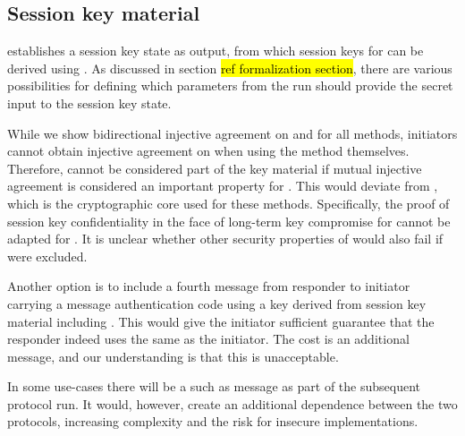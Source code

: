 \documentclass[runningheads,draft,x11names]{llncs}
\begin{document}

%

\subsection{Session key material}
\label{sec:sessionKeyMaterial}
\mEdhoc{} establishes a session key state as output, from which session keys for
\mOscore{} can be derived using \mHkdf{}.
%
As discussed in section \hl{ref formalization section}, there are various
possibilities for defining which parameters from the \mEdhoc{} run should
provide the secret input to the session key state.

While we show bidirectional injective agreement on \mGx{} and \mGy{}
for all methods, initiators cannot obtain injective agreement on \mGiy{} when
using the \mStat{} method themselves.
%
Therefore, \mGiy{} cannot be considered part of the key material if mutual
injective agreement is considered an important property for \mEdhoc{}.
%
This would deviate from \mOptls{}, which is the cryptographic core used for
these methods.
%
Specifically, the proof of session key confidentiality in the face of long-term
key compromise for \mOptls{} cannot be adapted for \mEdhoc{}.
%
It is unclear whether other security properties of \mOptls{} would also fail if
\mGiy{} were excluded.
%

Another option is to include a fourth message from responder to initiator
carrying a message authentication code using a key derived from session key
material including \mGiy{}.
%
This would give the initiator sufficient guarantee that the responder indeed
uses the same \mGiy{} as the initiator.
%
The cost is an additional message, and our understanding is that this is
unacceptable. 
%

In some use-cases there will be a such as message as part of
the subsequent \mOscore{} protocol run.
%
It would, however, create an additional dependence between the two protocols,
increasing complexity and the risk for insecure implementations.
%
\end{document}
